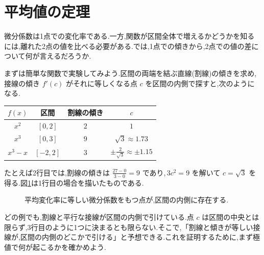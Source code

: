 \section{平均値の定理}\label{節:平均値定理}
微分係数は1点での変化率である.一方,関数が区間全体で増えるかどうかを知るには,離れた2点の値を比べる必要がある.では,1点での傾きから,2点での値の差について何が言えるだろうか.

まずは簡単な関数で実験してみよう.区間の両端を結ぶ直線(割線)の傾きを求め,接線の傾き $f'(c)$ がそれに等しくなる点 $c$ を区間の内側で探すと,次のようになる.
\begin{center}
\begin{tabular}{cccc}
\toprule
$f(x)$ & 区間 & 割線の傾き & $c$\\
\midrule
$x^2$ & $[0,2]$ & $2$ & $1$\\
$x^3$ & $[0,3]$ & $9$ & $\sqrt3\approx1.73$\\
$x^3-x$ & $[-2,2]$ & $3$ & $\pm\frac{2}{\sqrt3}\approx\pm1.15$\\
\bottomrule
\end{tabular}
\end{center}
たとえば2行目では,割線の傾きは $\frac{27-0}{3-0}=9$ であり,\,$3c^2=9$ を解いて $c=\sqrt3$ を得る.図\ref{図:平均値定理}は1行目の場合を描いたものである.

\begin{figure}[htbp]
\centering
{}
\caption{平均変化率に等しい微分係数をもつ点が,区間の内側に存在する.}
\label{図:平均値定理}
\end{figure}

どの例でも,割線と平行な接線が区間の内側で引けている.点 $c$ は区間の中央とは限らず,3行目のように1つに決まるとも限らない.そこで,「割線と傾きが等しい接線が,区間の内側のどこかで引ける」と予想できる.これを証明するために,まず極値で何が起こるかを確かめよう.

